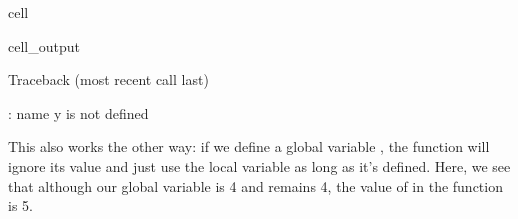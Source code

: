 \documentclass[letterpaper,10pt,english]{jupyterBook}
\begin{document}
\begin{sphinxuseclass}{cell}
\begin{sphinxVerbatimOutput}
\begin{sphinxuseclass}{cell_output}
\begin{sphinxVerbatim}[commandchars=\\\{\}]
Traceback (most recent call last)
  
 
 

: name \PYGZsq{}y\PYGZsq{} is not defined
\end{sphinxVerbatim}

\end{sphinxuseclass}\end{sphinxVerbatimOutput}

\end{sphinxuseclass}
\sphinxAtStartPar
This also works the other way: if we define a global variable , the function will ignore its value and just use the local variable  as long as it’s defined. Here, we see that although our global variable  is 4 and remains 4, the value of  in the function is 5.
\end{document}
